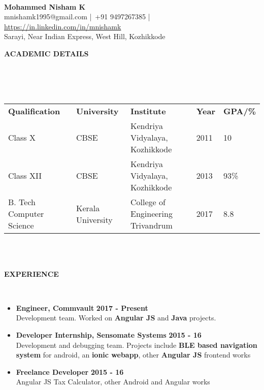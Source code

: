 \documentclass[a4paper,10pt]{article}
\newcommand{\lsep}{-0.5cm}
\newcommand{\resheading}[1]{{\small \colorbox{mygrey}{\begin{minipage}{0.975\textwidth}{\textbf{\uppercase{#1} \vphantom{p\^{E}}}}\end{minipage}}}}
\newcommand{\when}[1]{\hfill \textbf{#1}}
\newenvironment{noSepItemize}
{ \begin{itemize}
    \setlength{\itemsep}{1pt}
    \setlength{\parskip}{0pt}
    \setlength{\parsep}{0pt}     }
{ \end{itemize}                  }
\begin{document}
\hspace{0.5cm}\\[-0.2cm]

\begin{center}
\textbf{\Large{Mohammed Nisham K}} \\
mnishamk1995@gmail.com |\, +91 9497267385 |\, \href{https://in.linkedin.com/in/mnishamk}{https://in.linkedin.com/in/mnishamk}\\
Sarayi, Near Indian Express, West Hill, Kozhikkode \\
\end{center}

\resheading{\textbf{ACADEMIC DETAILS} }\\[\lsep]
\\ \\
\indent \begin{tabular}{ l @{\hskip 0.15in} l @{\hskip 0.15in} l @{\hskip 0.15in} l @{\hskip 0.15in} l }
\textbf{Qualification} & \textbf{University} & \textbf{Institute} & \textbf{Year} & \textbf{GPA/\%} \\
Class X & CBSE & Kendriya Vidyalaya, Kozhikkode & 2011 & 10 \\
Class XII & CBSE & Kendriya Vidyalaya, Kozhikkode & 2013 & 93\% \\
B. Tech Computer Science & Kerala University & College of Engineering Trivandrum & 2017 & 8.8\\
\end{tabular}
\\ \\

\resheading{\textbf{Experience} }\\[\lsep]
\begin{noSepItemize}
\item \noindent \textbf{Engineer, Commvault} \when{2017 - Present}\\
	\indent Development team. Worked on \textbf{Angular JS} and \textbf{Java} projects.
\item \noindent \textbf{Developer Internship, Sensomate Systems} \when{2015 - 16}\\
	\indent Development and debugging team. Projects include \textbf{BLE based navigation system} for android, an \textbf{ionic webapp}, other \textbf{Angular JS} frontend works
\item \noindent \textbf{Freelance Developer} \when{2015 - 16}\\
	\indent Angular JS Tax Calculator, other Android and Angular works
\end{noSepItemize}
\end{document}
